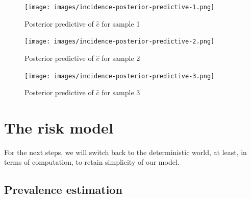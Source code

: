 \documentclass[
  digital, %
  oneside, %
  lof,     %
  lot,     %
]{fithesis4}
\begin{document}



\begin{figure}[h]
  \centering
  \texttt{[image: images/incidence-posterior-predictive-1.png]}
  \caption{Posterior predictive of $\hat{c}$ for sample 1}
  \label{fig:incidence-posterior-1}
\end{figure}

\begin{figure}[h]
  \centering
  \texttt{[image: images/incidence-posterior-predictive-2.png]}
  \caption{Posterior predictive of $\hat{c}$ for sample 2}
  \label{fig:incidence-posterior-2}
\end{figure}

\begin{figure}[h]
  \centering
  \texttt{[image: images/incidence-posterior-predictive-3.png]}
  \caption{Posterior predictive of $\hat{c}$ for sample 3}
  \label{fig:incidence-posterior-3}
\end{figure}


\chapter{The risk model}

For the next steps, we will switch back to the deterministic 
world, at least, in terms of computation, to retain simplicity of our model.

\section{Prevalence estimation}
\end{document}
